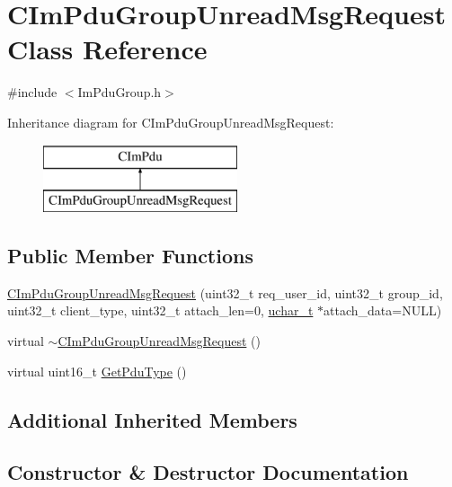 \hypertarget{class_c_im_pdu_group_unread_msg_request}{}\section{C\+Im\+Pdu\+Group\+Unread\+Msg\+Request Class Reference}
\label{class_c_im_pdu_group_unread_msg_request}


{\ttfamily \#include $<$Im\+Pdu\+Group.\+h$>$}

Inheritance diagram for C\+Im\+Pdu\+Group\+Unread\+Msg\+Request\+:\begin{figure}[H]
\begin{center}
\leavevmode
\includegraphics[height=2.000000cm]{class_c_im_pdu_group_unread_msg_request}
\end{center}
\end{figure}
\subsection*{Public Member Functions}
\begin{DoxyCompactItemize}
\item 
\hyperlink{class_c_im_pdu_group_unread_msg_request_a8fc03f94cc251aec746cd3b87bb96bee}{C\+Im\+Pdu\+Group\+Unread\+Msg\+Request} (uint32\+\_\+t req\+\_\+user\+\_\+id, uint32\+\_\+t group\+\_\+id, uint32\+\_\+t client\+\_\+type, uint32\+\_\+t attach\+\_\+len=0, \hyperlink{base_2ostype_8h_a124ea0f8f4a23a0a286b5582137f0b8d}{uchar\+\_\+t} $\ast$attach\+\_\+data=N\+U\+L\+L)
\item 
virtual \hyperlink{class_c_im_pdu_group_unread_msg_request_adfd729aebd48f5cf1d106798f1af8953}{$\sim$\+C\+Im\+Pdu\+Group\+Unread\+Msg\+Request} ()
\item 
virtual uint16\+\_\+t \hyperlink{class_c_im_pdu_group_unread_msg_request_a5b2b493e54a360bb9c709c2acb3b5e06}{Get\+Pdu\+Type} ()
\end{DoxyCompactItemize}
\subsection*{Additional Inherited Members}


\subsection{Constructor \& Destructor Documentation}
\hypertarget{class_c_im_pdu_group_unread_msg_request_a8fc03f94cc251aec746cd3b87bb96bee}{}
